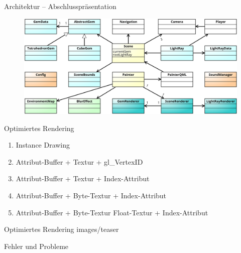 \begin{frame}{Architektur -- Abschlusspräsentation}
	\begin{figure}
		\centering
		\includegraphics[width=\textwidth, height=0.8\textheight, keepaspectratio]{images/klassendiagramm-final}
	\end{figure}
\end{frame}

\begin{frame}{Optimiertes Rendering}
	\begin{enumerate}
		\item Instance Drawing
		\vfill
		\item Attribut-Buffer + Textur + gl\_VertexID
		\vfill
		\item Attribut-Buffer + Textur + Index-Attribut
		\vfill
		\item Attribut-Buffer + Byte-Textur + Index-Attribut
		\vfill
		\item Attribut-Buffer + Byte-Textur \/ Float-Textur + Index-Attribut
	\end{enumerate}
\end{frame}

\slidegraphic
{Optimiertes Rendering}
{images/teaser}
{}

\begin{frame}{Fehler und Probleme}
	\centering
\end{frame}

